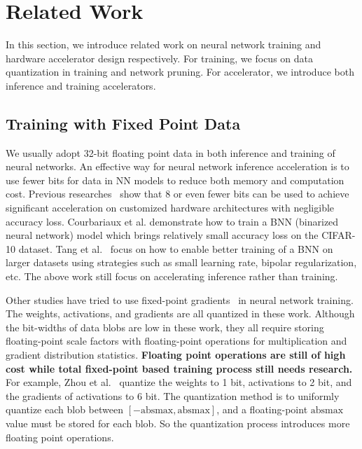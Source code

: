 \section{Related Work}\label{sec:rw}
In this section, we introduce related work on neural network training and hardware accelerator design respectively. For training, we focus on data quantization in training and network pruning. For accelerator, we introduce both inference and training accelerators.

\subsection{Training with Fixed Point Data}\label{sec:rw:fixed_train}
We usually adopt 32-bit floating point data in both inference and training of neural networks. An effective way for neural network inference acceleration is to use fewer bits for data in NN models to reduce both memory and computation cost. Previous researches~\cite{han2016eie,qiu2016going} show that 8 or even fewer bits can be used to achieve significant acceleration on customized hardware architectures with negligible accuracy loss. Courbariaux et al.\cite{hubara2016binarized} demonstrate how to train a BNN (binarized neural network) model which brings relatively small accuracy loss on the CIFAR-10 dataset. Tang et al.~\cite{tang2017train} focus on how to enable better training of a BNN on larger datasets using strategies such as small learning rate, bipolar regularization, etc. The above work still focus on accelerating inference rather than training.

Other studies have tried to use fixed-point gradients~\cite{hubara2016binarized, hubara2017quantized, zhou2016dorefa} in neural network training. The weights, activations, and gradients are all quantized in these work. Although the bit-widths of data blobs are low in these work, they all require storing floating-point scale factors with floating-point operations for multiplication and gradient distribution statistics.  {\bf{Floating point operations are still of high cost while total fixed-point based training process still needs research.}} For example, Zhou et al.~\cite{zhou2016dorefa} quantize the weights to 1 bit, activations to 2 bit, and the gradients of activations to 6 bit. The quantization method is to uniformly quantize each blob between $[-\mbox{absmax}, \mbox{absmax}]$, and a floating-point $\mbox{absmax}$ value must be stored for each blob. So the quantization process introduces more floating point operations.

